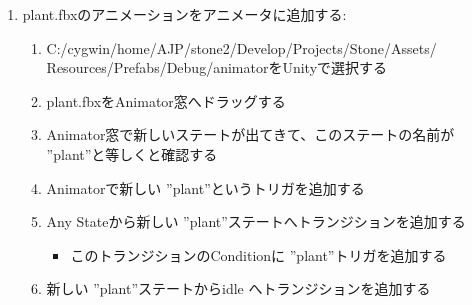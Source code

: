 \documentclass[a4paper]{report}
\newcommand{\fbxname}{{\ttfamily plant.fbx}}
\newcommand{\name}{ {\ttfamily ''plant''}}
\begin{document}
\begin{enumerate}
\begin{enumerate}
\begin{enumerate}
\begin{enumerate}
\begin{itemize}
							\end{itemize}
					\end{enumerate}
			\end{enumerate}
	\end{enumerate}
\item \fbxname のアニメーションをアニメータに追加する:\begin{enumerate}
		\item {\ttfamily C:/cygwin/home/AJP/stone2/Develop/Projects/Stone/Assets/}\\{\ttfamily Resources/Prefabs/Debug/animator}をUnityで選択する
		\item \fbxname をAnimator窓へドラッグする
		\item Animator窓で新しいステートが出てきて、このステートの名前が\name と等しくと確認する
		\item Animatorで新しい\name というトリガを追加する
		\item Any Stateから新しい \name ステートへトランジションを追加する
			\begin{itemize}
				\item このトランジションのConditionに\name トリガを追加する
			\end{itemize}
		\item 新しい \name ステートからidle へトランジションを追加する
	\end{enumerate}
\end{enumerate}
\end{document}
